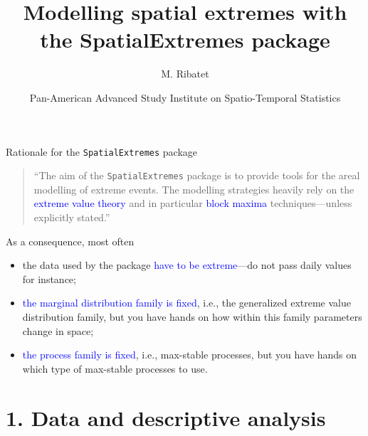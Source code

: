 \documentclass[blackslide,style=simple]{powerdot}
\title{Modelling spatial extremes with the SpatialExtremes package}
\author{M. Ribatet}
\date{Pan-American Advanced Study Institute on Spatio-Temporal Statistics}
\theoremstyle{plain}%
\theoremstyle{definition}
\theoremstyle{remark}
\begin{document}
\maketitle

\begin{wideslide}[toc=]{Rationale for the \texttt{SpatialExtremes} package}
  \begin{quotation}
    ``The aim of the \texttt{SpatialExtremes} package is to provide
    tools for the areal modelling of extreme events. The modelling
    strategies heavily rely on the \textcolor{blue}{extreme value
      theory} and in particular \textcolor{blue}{block maxima}
    techniques---unless explicitly stated.''
  \end{quotation}
  
  As a consequence, most often
  \begin{itemize}
  \item the data used by the package \textcolor{blue}{have to be
      extreme}---do not pass daily values for instance;
  \item \textcolor{blue}{the marginal distribution family is fixed},
    i.e., the generalized extreme value distribution family, but you
    have hands on how within this family parameters change in space;
  \item \textcolor{blue}{the process family is fixed}, i.e.,
    max-stable processes, but you have hands on which type of
    max-stable processes to use.
  \end{itemize}
\end{wideslide}

\section{1. Data and descriptive analysis}
\end{document}
